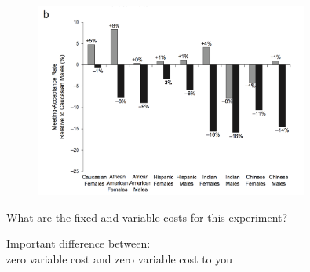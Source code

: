 \documentclass[aspectratio=169]{beamer}
\begin{document}
\begin{frame}

\begin{figure}
  \centering
  \includegraphics[width=0.8\textwidth]{figures/milkman_temporal_2012_fig2b.png}
\end{figure}

\end{frame}
\begin{frame}

What are the fixed and variable costs for this experiment?

\end{frame}
\begin{frame}

{\Large
\begin{center}
Important difference between:\\
zero variable cost and zero variable cost to you
\end{center}
}

\end{frame}
\frame{\titlepage}

\end{document}
